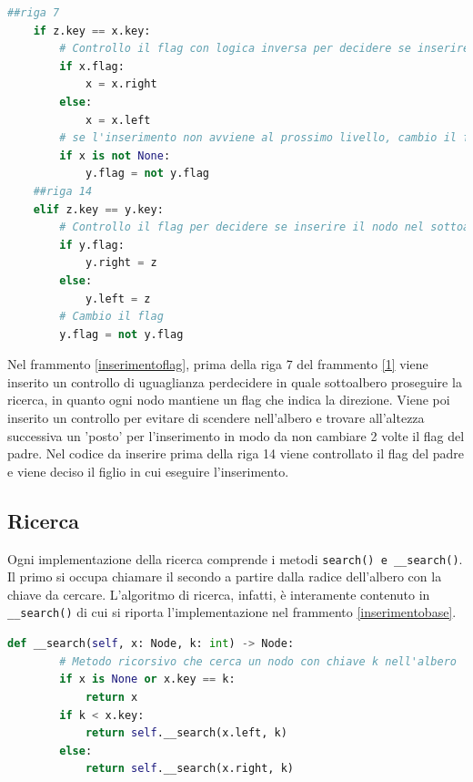 \documentclass{article}
\begin{document}
\begin{lstlisting}[language=Python, caption={Algoritmo di inserimento nell'implementazione con flag}, label=inserimentoflag]
    ##riga 7
    if z.key == x.key:
        # Controllo il flag con logica inversa per decidere se inserire il nodo nel sottoalbero sinistro o destro
        if x.flag:
            x = x.right
        else:
            x = x.left
        # se l'inserimento non avviene al prossimo livello, cambio il flag in modo da bilanciare i molti valori ripetuti
        if x is not None:
            y.flag = not y.flag
    ##riga 14
    elif z.key == y.key:
        # Controllo il flag per decidere se inserire il nodo nel sottoalbero sinistro o destro del padre
        if y.flag:
            y.right = z
        else:
            y.left = z
        # Cambio il flag
        y.flag = not y.flag
\end{lstlisting}
Nel frammento \ref{inserimentoflag}, prima della riga 7 del frammento \ref{1} viene inserito un controllo di uguaglianza perdecidere in quale sottoalbero proseguire la ricerca, in quanto ogni nodo mantiene un flag che indica la direzione. Viene poi inserito un controllo per evitare di scendere nell'albero e trovare all'altezza successiva un 'posto' per l'inserimento in modo da non cambiare 2 volte il flag del padre. Nel codice da inserire prima della riga 14 viene controllato il flag del padre e viene deciso il figlio in cui eseguire l'inserimento.

\subsection{Ricerca}
Ogni implementazione della ricerca comprende i metodi \verb|search() e __search()|.
Il primo si occupa chiamare il secondo a partire dalla radice dell'albero con la chiave da cercare.
L'algoritmo di ricerca, infatti, è interamente contenuto in \verb|__search()| di cui si riporta l'implementazione nel frammento \ref{inserimentobase}.

\begin{lstlisting}[language=Python, caption={Algoritmo di ricerca base}, label=ricercabase]
    def __search(self, x: Node, k: int) -> Node:
        # Metodo ricorsivo che cerca un nodo con chiave k nell'albero
        if x is None or x.key == k:
            return x
        if k < x.key:
            return self.__search(x.left, k)
        else:
            return self.__search(x.right, k)
\end{lstlisting}
\end{document}

